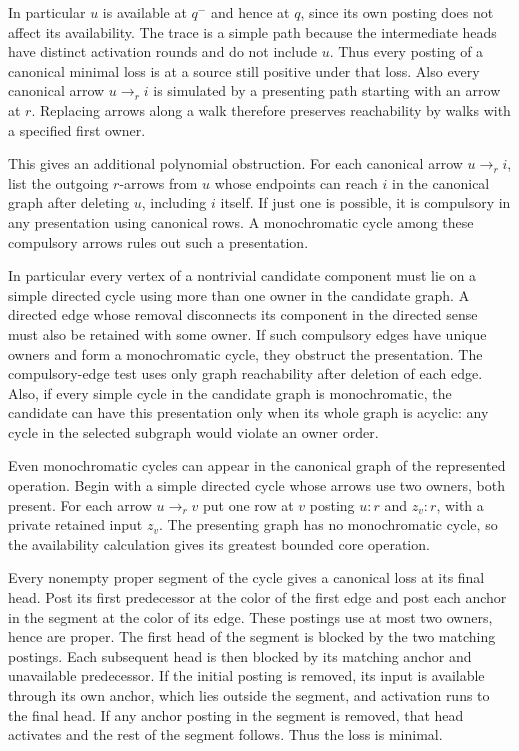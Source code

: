 In particular $u$ is available at $q^-$ and hence
at $q$, since its own posting does not affect its
availability. The trace is a simple path because
the intermediate heads have distinct activation
rounds and do not include $u$. Thus every posting
of a canonical minimal loss is at a source still
positive under that loss. Also every canonical arrow
$u\to_r i$ is simulated by a presenting path starting
with an arrow at $r$. Replacing arrows along a walk
therefore preserves reachability by walks with a
specified first owner.

This gives an additional polynomial obstruction. For
each canonical arrow $u\to_r i$, list the outgoing
$r$-arrows from $u$ whose endpoints can reach $i$ in
the canonical graph after deleting $u$, including $i$
itself. If just one
is possible, it is compulsory in any presentation
using canonical rows. A monochromatic cycle among
these compulsory arrows rules out such a presentation.

In particular every vertex of a nontrivial candidate
component must lie on a simple directed cycle using
more than one owner in the candidate graph. A directed
edge whose removal disconnects its component in the
directed sense must also be retained with some owner.
If such compulsory edges have unique owners and form
a monochromatic cycle, they obstruct the presentation.
The compulsory-edge test uses only graph reachability
after deletion of each edge. Also, if every simple
cycle in the candidate graph is monochromatic, the
candidate can have this presentation only when its
whole graph is acyclic: any cycle in the selected
subgraph would violate an owner order.

Even monochromatic cycles can appear in the canonical
graph of the represented operation. Begin with a simple
directed cycle whose arrows use two owners, both present.
For each arrow $u\to_r v$ put one row at $v$ posting
$u:r$ and $z_v:r$, with a private retained input $z_v$.
The presenting graph has no monochromatic cycle, so the
availability calculation gives its greatest bounded
core operation.

Every nonempty proper segment of the cycle gives a
canonical loss at its final head. Post its first
predecessor at the color of the first edge and post
each anchor in the segment at the color of its edge.
These postings use at most two owners, hence are
proper. The first head of the segment is blocked by
the two matching postings. Each subsequent head is
then blocked by its matching anchor and unavailable
predecessor. If the initial posting is removed, its
input is available through its own anchor, which
lies outside the segment, and activation runs to
the final head. If any anchor posting in the
segment is removed, that head activates and the
rest of the segment follows. Thus the loss is
minimal.

